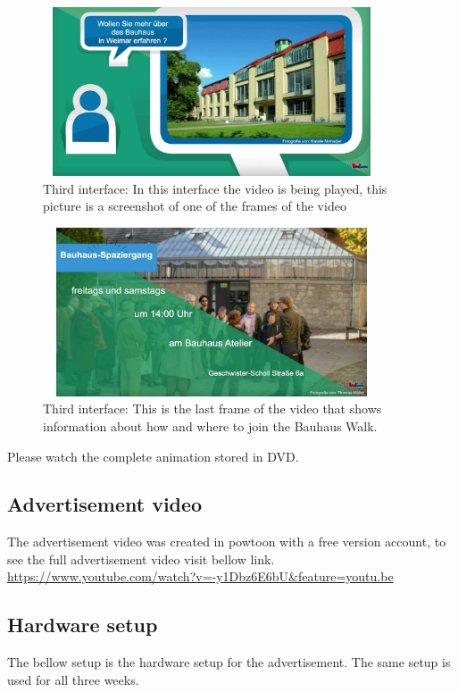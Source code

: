 \begin{figure}[H]
    \centering
    \includegraphics[width=100mm,height=50mm]{Figures/7/ad_first}
    \caption{Third interface: In this interface the video is being played, this picture is a screenshot of one of the frames of the video}%
    \label{fig:adthirdpage1}%
\end{figure}


\begin{figure}[H]
    \centering
    \includegraphics[width=100mm,height=50mm]{Figures/7/ad_last}
    \caption{Third interface: This is the last frame of the video that shows information about how and where to join the Bauhaus Walk.}%
    \label{fig:adthirdpage2}%
\end{figure}

Please watch the complete animation stored in DVD. 


\subsection{Advertisement video}
The advertisement video was created in powtoon \cite{powtoon} with a free version account, to see the full advertisement video visit bellow link.\\ \url{https://www.youtube.com/watch?v=-y1Dbz6E6bU&feature=youtu.be}

\subsection{Hardware setup}
The bellow setup is the hardware setup for the advertisement. The same setup is used for all three weeks.

